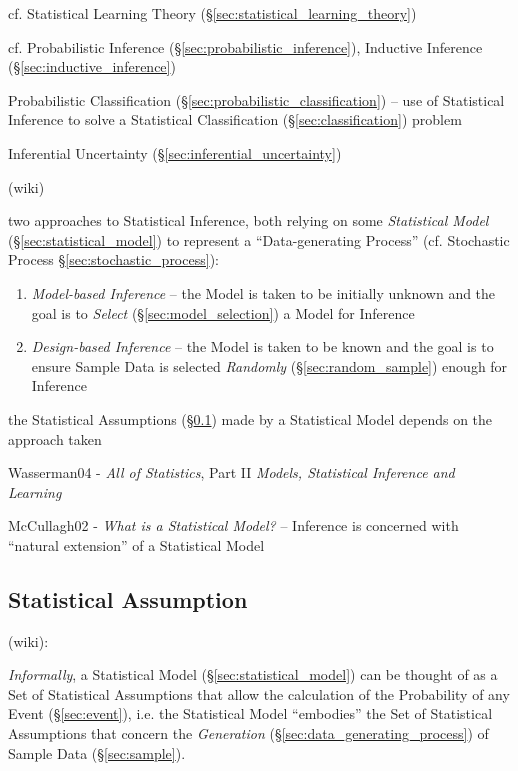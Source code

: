 \fist cf. Statistical Learning Theory (\S\ref{sec:statistical_learning_theory})

\fist cf. Probabilistic Inference
(\S\ref{sec:probabilistic_inference}), Inductive Inference
(\S\ref{sec:inductive_inference})

\fist Probabilistic Classification (\S\ref{sec:probabilistic_classification}) --
use of Statistical Inference to solve a Statistical Classification
(\S\ref{sec:classification}) problem

\fist Inferential Uncertainty (\S\ref{sec:inferential_uncertainty})

(wiki)

two approaches to Statistical Inference, both relying on some \emph{Statistical
  Model} (\S\ref{sec:statistical_model}) to represent a ``Data-generating
Process'' (cf. Stochastic Process \S\ref{sec:stochastic_process}):
\begin{enumerate}
  \item \emph{Model-based Inference} -- the Model is taken to be initially
    unknown and the goal is to \emph{Select} (\S\ref{sec:model_selection}) a
    Model for Inference
  \item \emph{Design-based Inference} -- the Model is taken to be known and the
    goal is to ensure Sample Data is selected \emph{Randomly}
    (\S\ref{sec:random_sample}) enough for Inference
\end{enumerate}
the Statistical Assumptions (\S\ref{sec:statistical_assumption}) made by a
Statistical Model depends on the approach taken

Wasserman04 - \emph{All of Statistics}, Part II \emph{Models, Statistical
  Inference and Learning}

McCullagh02 - \emph{What is a Statistical Model?} -- Inference is concerned with
``natural extension'' of a Statistical Model



\subsection{Statistical Assumption}\label{sec:statistical_assumption}

(wiki):

\emph{Informally}, a Statistical Model (\S\ref{sec:statistical_model}) can be
thought of as a Set of Statistical Assumptions that allow the calculation of the
Probability of any Event (\S\ref{sec:event}), i.e. the Statistical Model
``embodies'' the Set of Statistical Assumptions that concern the
\emph{Generation} (\S\ref{sec:data_generating_process}) of Sample Data
(\S\ref{sec:sample}).

